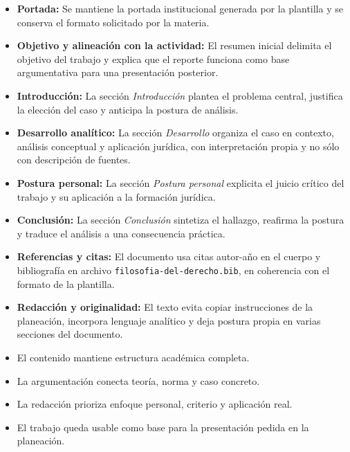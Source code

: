 \documentclass[
	spanish,
	letterpaper, oneside
]{article}
\begin{document}
\begin{itemize}
	\item \textbf{Portada:} Se mantiene la portada institucional generada por la plantilla y se conserva el formato solicitado por la materia.
	\item \textbf{Objetivo y alineación con la actividad:} El resumen inicial delimita el objetivo del trabajo y explica que el reporte funciona como base argumentativa para una presentación posterior.
	\item \textbf{Introducción:} La sección \textit{Introducción} plantea el problema central, justifica la elección del caso y anticipa la postura de análisis.
	\item \textbf{Desarrollo analítico:} La sección \textit{Desarrollo} organiza el caso en contexto, análisis conceptual y aplicación jurídica, con interpretación propia y no sólo con descripción de fuentes.
	\item \textbf{Postura personal:} La sección \textit{Postura personal} explicita el juicio crítico del trabajo y su aplicación a la formación jurídica.
	\item \textbf{Conclusión:} La sección \textit{Conclusión} sintetiza el hallazgo, reafirma la postura y traduce el análisis a una consecuencia práctica.
	\item \textbf{Referencias y citas:} El documento usa citas autor-año en el cuerpo y bibliografía en archivo \texttt{filosofia-del-derecho.bib}, en coherencia con el formato de la plantilla.
	\item \textbf{Redacción y originalidad:} El texto evita copiar instrucciones de la planeación, incorpora lenguaje analítico y deja postura propia en varias secciones del documento.
\end{itemize}

\begin{itemize}
	\item[\checkmark] El contenido mantiene estructura académica completa.
	\item[\checkmark] La argumentación conecta teoría, norma y caso concreto.
	\item[\checkmark] La redacción prioriza enfoque personal, criterio y aplicación real.
	\item[\checkmark] El trabajo queda usable como base para la presentación pedida en la planeación.
\end{itemize}
%
\end{document}
